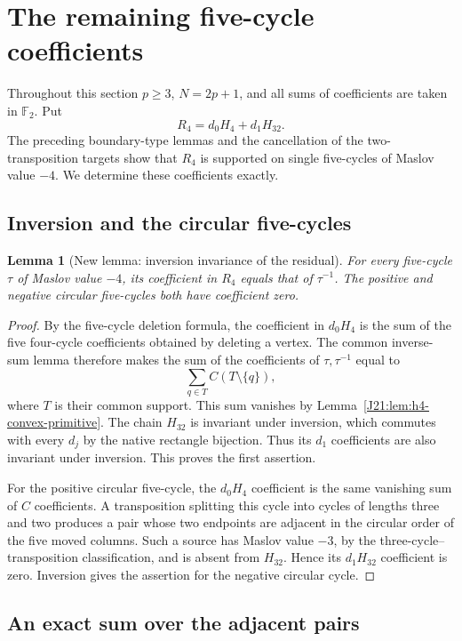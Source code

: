 \documentclass[11pt,oneside]{report}
\newtheorem{lemma}[theorem]{Lemma}
\theoremstyle{definition}
\numberwithin{equation}{section}
\begin{document}
\section{The remaining five-cycle coefficients}
\label{J21:sec:m4-B}

Throughout this section $p\geq3$, $N=2p+1$, and all sums of coefficients
are taken in $\mathbb F _2$. Put
\[
                    R_4=d_0H_4+d_1H_{32}.
\]
The preceding boundary-type lemmas and the cancellation of the
two-transposition targets show that $R_4$ is supported on single
five-cycles of Maslov value $-4$. We determine these coefficients exactly.

\subsection{Inversion and the circular five-cycles}

\begin{lemma}[New lemma: inversion invariance of the residual]
\label{J21:lem:m4-residual-inverse}
For every five-cycle $\tau$ of Maslov value $-4$, its coefficient in
$R_4$ equals that of $\tau^{-1}$. The positive and negative circular
five-cycles both have coefficient zero.
\end{lemma}
\begin{proof}
By the five-cycle deletion formula, the coefficient in $d_0H_4$ is the
sum of the five four-cycle coefficients obtained by deleting a vertex.
The common inverse-sum lemma therefore makes the sum of the coefficients
of $\tau,\tau^{-1}$ equal to
\[
                     \sum_{q\in T} C(T\setminus\{q\}),
\]
where $T$ is their common support. This sum vanishes by
Lemma~\ref{J21:lem:h4-convex-primitive}. The chain $H_{32}$ is invariant
under inversion, which commutes with every $d_j$ by the native rectangle
bijection. Thus its $d_1$ coefficients are also invariant under inversion.
This proves the first assertion.

For the positive circular five-cycle, the $d_0H_4$ coefficient is the
same vanishing sum of $C$ coefficients. A transposition splitting this
cycle into cycles of lengths three and two produces a pair whose two
endpoints are adjacent in the circular order of the five moved columns.
Such a source has Maslov value $-3$, by the three-cycle--transposition
classification, and is absent from $H_{32}$. Hence its $d_1H_{32}$
coefficient is zero. Inversion gives the assertion for the negative
circular cycle.
\end{proof}

\subsection{An exact sum over the adjacent pairs}
\end{document}
